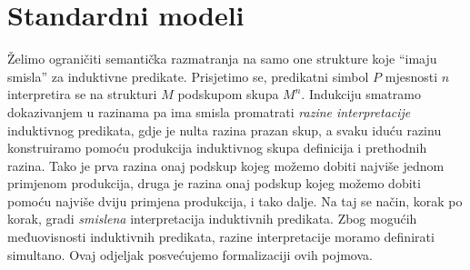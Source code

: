 \section{Standardni modeli}\label{sec:standardni-modeli}
Želimo ograničiti semantička razmatranja na samo one strukture koje \enquote{imaju smisla} za induktivne predikate.
Prisjetimo se, predikatni simbol \(P\) mjesnosti \(n\) interpretira se na strukturi \(M\)  podskupom skupa \(M^{n}\).
Indukciju smatramo dokazivanjem \textup{u razinama} pa ima smisla promatrati \textit{razine interpretacije} induktivnog predikata,
gdje je nulta razina prazan skup,
a svaku iduću razinu konstruiramo pomoću produkcija induktivnog skupa definicija i prethodnih razina.
Tako je prva razina onaj podskup kojeg možemo dobiti najviše jednom primjenom produkcija,
druga je razina onaj podskup kojeg možemo dobiti pomoću najviše dviju primjena produkcija, i tako dalje.
Na taj se način, korak po korak, gradi \textit{smislena} interpretacija induktivnih predikata.
Zbog mogućih međuovisnosti induktivnih predikata,
razine interpretacije moramo definirati simultano.
Ovaj odjeljak posvećujemo formalizaciji ovih pojmova.

